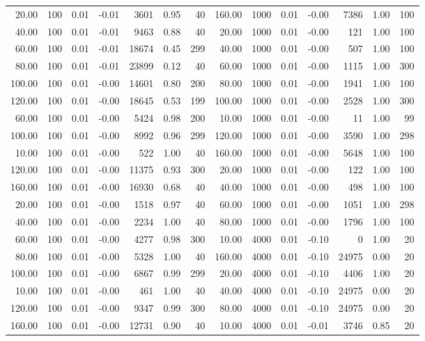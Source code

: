 \begin{table}[ht]
{\begin{tabular}{|rrrrrrr||rrrrrrr|}
  20.00 & 100 & 0.01 & -0.01 & 3601 & 0.95 & 40 & 160.00 & 1000 & 0.01 & -0.00 & 7386 & 1.00 & 100 \\ 
  40.00 & 100 & 0.01 & -0.01 & 9463 & 0.88 & 40 & 20.00 & 1000 & 0.01 & -0.00 & 121 & 1.00 & 100 \\ 
  60.00 & 100 & 0.01 & -0.01 & 18674 & 0.45 & 299 & 40.00 & 1000 & 0.01 & -0.00 & 507 & 1.00 & 100 \\ 
  80.00 & 100 & 0.01 & -0.01 & 23899 & 0.12 & 40 & 60.00 & 1000 & 0.01 & -0.00 & 1115 & 1.00 & 300 \\ 
  100.00 & 100 & 0.01 & -0.00 & 14601 & 0.80 & 200 & 80.00 & 1000 & 0.01 & -0.00 & 1941 & 1.00 & 100 \\ 
  120.00 & 100 & 0.01 & -0.00 & 18645 & 0.53 & 199 & 100.00 & 1000 & 0.01 & -0.00 & 2528 & 1.00 & 300 \\ 
  60.00 & 100 & 0.01 & -0.00 & 5424 & 0.98 & 200 & 10.00 & 1000 & 0.01 & -0.00 & 11 & 1.00 & 99 \\ 
  100.00 & 100 & 0.01 & -0.00 & 8992 & 0.96 & 299 & 120.00 & 1000 & 0.01 & -0.00 & 3590 & 1.00 & 298 \\ 
  10.00 & 100 & 0.01 & -0.00 & 522 & 1.00 & 40 & 160.00 & 1000 & 0.01 & -0.00 & 5648 & 1.00 & 100 \\ 
  120.00 & 100 & 0.01 & -0.00 & 11375 & 0.93 & 300 & 20.00 & 1000 & 0.01 & -0.00 & 122 & 1.00 & 100 \\ 
  160.00 & 100 & 0.01 & -0.00 & 16930 & 0.68 & 40 & 40.00 & 1000 & 0.01 & -0.00 & 498 & 1.00 & 100 \\ 
  20.00 & 100 & 0.01 & -0.00 & 1518 & 0.97 & 40 & 60.00 & 1000 & 0.01 & -0.00 & 1051 & 1.00 & 298 \\ 
  40.00 & 100 & 0.01 & -0.00 & 2234 & 1.00 & 40 & 80.00 & 1000 & 0.01 & -0.00 & 1796 & 1.00 & 100 \\ 
  60.00 & 100 & 0.01 & -0.00 & 4277 & 0.98 & 300 & 10.00 & 4000 & 0.01 & -0.10 & 0 & 1.00 & 20 \\ 
  80.00 & 100 & 0.01 & -0.00 & 5328 & 1.00 & 40 & 160.00 & 4000 & 0.01 & -0.10 & 24975 & 0.00 & 20 \\ 
  100.00 & 100 & 0.01 & -0.00 & 6867 & 0.99 & 299 & 20.00 & 4000 & 0.01 & -0.10 & 4406 & 1.00 & 20 \\ 
  10.00 & 100 & 0.01 & -0.00 & 461 & 1.00 & 40 & 40.00 & 4000 & 0.01 & -0.10 & 24975 & 0.00 & 20 \\ 
  120.00 & 100 & 0.01 & -0.00 & 9347 & 0.99 & 300 & 80.00 & 4000 & 0.01 & -0.10 & 24975 & 0.00 & 20 \\ 
  160.00 & 100 & 0.01 & -0.00 & 12731 & 0.90 & 40 & 10.00 & 4000 & 0.01 & -0.01 & 3746 & 0.85 & 20 \\ 

\end{tabular}}
\end{table}
